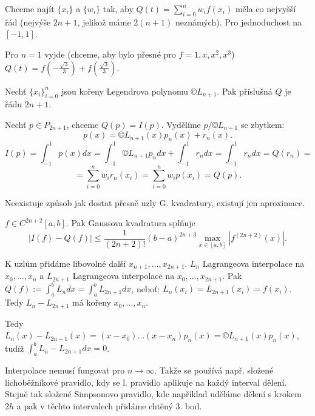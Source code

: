 \documentclass[12pt]{article}					%
\begin{document}

\begin{definice}
	Chceme najít $\{x_i\}$ a $\{w_i\}$ tak, aby $Q(t) = \sum_{i=0}^n w_i f(x_i)$ měla co nejvyšší řád (nejvýše $2n + 1$, jelikož máme $2(n+1)$ neznámých). Pro jednoduchost na $[-1, 1]$.

	Pro $n=1$ vyjde (chceme, aby bylo přesné pro $f = 1, x, x^2, x^3$) $Q(t) = f(-\frac{\sqrt{3}}{3}) + f(\frac{\sqrt{3}}{3})$.

	\begin{vetain}
		Nechť $\{x_i\}_{i=0}^n$ jsou kořeny Legendrova polynomu $©L_{n+1}$. Pak příslušná $Q$ je řádu $2n + 1$.

		\begin{dukazin}
			Nechť $p \in P_{2n+1}$, chceme $Q(p) = I(p)$. Vydělíme $p / ©L_{n+1}$ se zbytkem:
			$$ p(x) = ©L_{n+1}(x) p_n(x) + r_n(x). $$
			$$ I(p) = \int_{-1}^1 p(x) dx = \int_{-1}^1 ©L_{n+1} p_n dx + \int_{-1}^1 r_n dx = \int_{-1}^1 r_n dx = Q(r_n) = $$
			$$ = \sum_{i=0}^n w_i r_n(x_i) = \sum_{i=0}^n w_i p(x_i) = Q(p). $$
		\end{dukazin}
	\end{vetain}

	\begin{poznamkain}
		Neexistuje způsob jak dostat přesně uzly G. kvadratury, existují jen aproximace.
	\end{poznamkain}
\end{definice}

\begin{veta}
	$f \in C^{2n + 2}[a, b]$. Pak Gaussova kvadratura splňuje
	$$ |I(f) - Q(f)| ≤ \frac{1}{(2n + 2)!} (b - a)^{2n + 3} \max_{x \in [a, b]} |f^{(2n + 2)} (x)|. $$

	\begin{dukazin}
		K uzlům přidáme libovolné další $x_{n+1}, …, x_{2n + 1}$. $L_n$ Lagrangeova interpolace na $x_0, …, x_n$ a $L_{2n+1}$ Lagrangeova interpolace na $x_0, …, x_{2n+1}$. Pak $Q(f) := \int_a^b L_n dx = \int_a^b L_{2n + 1} dx$, neboť: $L_n(x_i) = L_{2n + 1}(x_i) = f(x_i)$. Tedy $L_n - L_{2n + 1}$ má kořeny $x_0, …, x_n$.

		Tedy $L_n(x) - L_{2n + 1}(x) = (x - x_0)…(x - x_n) p_n(x) = ©L_{n+1}(x) p_n(x)$, tudíž $\int_a^b L_n - L_{2n + 1} dx = 0$.
	\end{dukazin}
\end{veta}

\begin{poznamka}
	Interpolace nemusí fungovat pro $n \rightarrow ∞$. Takže se používá např. složené lichoběžníkové pravidlo, kdy se l. pravidlo aplikuje na každý interval dělení. Stejně tak složené Simpsonovo pravidlo, kde například uděláme dělení s krokem $2h$ a pak v těchto intervalech přidáme chtěný 3. bod.
\end{poznamka}
\end{document}
